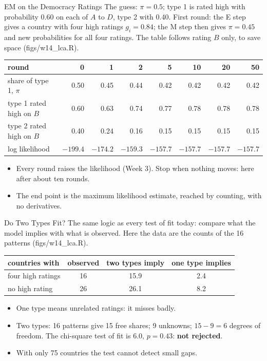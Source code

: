 \documentclass[aspectratio=169,11pt,xcolor=dvipsnames]{beamer}
\newcommand{\srcp}[1]{{\scriptsize\color{gray}(#1)}}
\begin{document}
\begin{frame}{EM on the Democracy Ratings}
The guess: $\pi = 0.5$; type 1 is rated high with probability 0.60 on each of $A$ to $D$, type 2
with 0.40. First round: the E step gives a country with four high ratings $g_i = 0.84$; the M
step then gives $\pi = 0.45$ and new probabilities for all four ratings. The table follows
rating $B$ only, to save space \srcp{figs/w14\_lca.R}.
\vskip2pt
\begin{center}\small
\renewcommand{\arraystretch}{1.08}
\setlength{\tabcolsep}{4pt}
\begin{tabular}{@{}lrrrrrrr@{}}
\toprule
round & 0 & 1 & 2 & 5 & 10 & 20 & 50 \\
\midrule
share of type 1, $\pi$ & 0.50 & 0.45 & 0.44 & 0.42 & 0.42 & 0.42 & 0.42 \\
type 1 rated high on $B$ & 0.60 & 0.63 & 0.74 & 0.77 & 0.78 & 0.78 & 0.78 \\
type 2 rated high on $B$ & 0.40 & 0.24 & 0.16 & 0.15 & 0.15 & 0.15 & 0.15 \\
log likelihood & $-199.4$ & $-174.2$ & $-159.3$ & $-157.7$ & $-157.7$ & $-157.7$ & $-157.7$ \\
\bottomrule
\end{tabular}
\end{center}
\vskip-3pt
\begin{itemize}\itemsep4pt
  \item Every round raises the likelihood (Week 3). Stop when nothing moves: here after about
        ten rounds.
  \item The end point is the maximum likelihood estimate, reached by counting, with no
        derivatives.
\end{itemize}
\end{frame}

\begin{frame}{Do Two Types Fit?}
The same logic as every test of fit today: compare what the model implies with what is
observed. Here the data are the counts of the 16 patterns \srcp{figs/w14\_lca.R}.
\begin{center}\small
\renewcommand{\arraystretch}{1.08}
\begin{tabular}{@{}lccc@{}}
\toprule
countries with & observed & two types imply & one type implies \\
\midrule
four high ratings & 16 & 15.9 & 2.4 \\
no high rating & 26 & 26.1 & 8.2 \\
\bottomrule
\end{tabular}
\end{center}
\begin{itemize}\itemsep5pt
  \item One type means unrelated ratings: it misses badly.
  \item Two types: 16 patterns give 15 free shares; 9 unknowns; $15 - 9 = 6$ degrees of freedom.
        The chi-square test of fit is 6.0, $p = 0.43$: \textbf{not rejected}.
  \item With only 75 countries the test cannot detect small gaps.
\end{itemize}
\end{frame}
\end{document}
